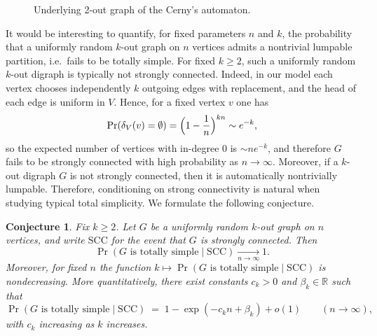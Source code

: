 \documentclass[a4paper,10pt]{amsart}
\theoremstyle{plain}
\newtheorem{conjecture}[theorem]{Conjecture}
\theoremstyle{definition}
\begin{document}
\begin{figure}[t]
  \centering
  \caption{Underlying 2-out graph of the Cerny's automaton.}
  \label{fig:cerny-underlying}
\end{figure}
It would be interesting to quantify, for fixed parameters $n$ and $k$, the probability that a uniformly random $k$-out graph on
$n$ vertices admits a nontrivial lumpable partition, i.e.\ fails to be totally simple.
For fixed $k\ge 2$, such a uniformly random $k$-out digraph is typically not strongly connected.
Indeed, in our model each vertex chooses independently $k$ outgoing edges with replacement, and the head of each edge is uniform in $V$.
Hence, for a fixed vertex $v$ one has
\[
\Pr(\delta_{V}(v)=\emptyset)=\Bigl(1-\frac{1}{n}\Bigr)^{kn}\sim e^{-k},
\]
so the expected number of vertices with in-degree $0$ is $\sim n e^{-k}$, and therefore $G$ fails to be strongly connected with high
probability as $n\to\infty$. Moreover, if a $k$-out digraph $G$ is not strongly connected, then it is automatically nontrivially lumpable. Therefore, conditioning on strong connectivity is natural when studying typical total simplicity. We formulate the following conjecture.

\begin{conjecture}\label{conj:typical-total-simplicity}
Fix $k\ge 2$. Let $G$ be a uniformly random $k$-out graph on $n$ vertices, and write $\mathrm{SCC}$ for the event that $G$
is strongly connected. Then
\[
\Pr(\text{$G$ is totally simple}\mid \mathrm{SCC}) \xrightarrow[n\to\infty]{} 1.
\]
Moreover, for fixed $n$ the function $k \longmapsto \Pr(\text{$G$ is totally simple}\mid \mathrm{SCC})$ is nondecreasing. More quantitatively, there exist constants $c_k>0$ and $\beta_k\in\mathbb R$ such that
\[
\Pr(\text{$G$ is totally simple}\mid \mathrm{SCC})
\;=\;
1-\exp(-c_k n+\beta_k)+o(1)
\qquad (n\to\infty),
\]
with $c_k$ increasing as $k$ increases.
\end{conjecture}
\end{document}
